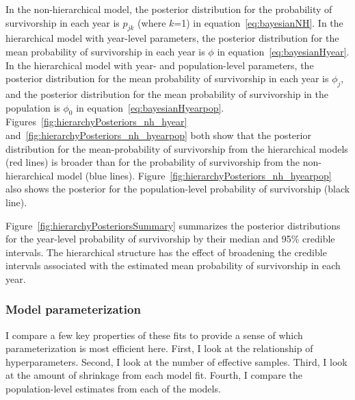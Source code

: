 \documentclass[12pt, oneside, titlepage]{article}   	%
\begin{document}
In the non-hierarchical model, the posterior distribution for the probability of survivorship in each year is $p_{jk}$ (where $k$=1) in equation~\eqref{eq:bayesianNH}. In the hierarchical model with year-level parameters, the posterior distribution for the mean probability of survivorship in each year is $\phi$ in equation~\eqref{eq:bayesianHyear}. In the hierarchical model with year- and population-level parameters, the posterior distribution for the mean probability of survivorship in each year is $\phi_j$, and the posterior distribution for the mean probability of survivorship in the population is $\phi_0$ in equation~\eqref{eq:bayesianHyearpop}. Figures~\ref{fig:hierarchyPosteriors_nh_hyear} and~\ref{fig:hierarchyPosteriors_nh_hyearpop} both show that the posterior distribution for the mean-probability of survivorship from the hierarchical models (red lines) is broader than for the probability of survivorship from the non-hierarchical model (blue lines). Figure~\ref{fig:hierarchyPosteriors_nh_hyearpop} also shows the posterior for the population-level probability of survivorship (black line).

Figure~\ref{fig:hierarchyPosteriorsSummary} summarizes the posterior distributions for the year-level probability of survivorship by their median and 95\% credible intervals. The hierarchical structure has the effect of broadening the credible intervals associated with the estimated mean probability of survivorship in each year. 
 
\subsubsection*{Model parameterization}
I compare a few key properties of these fits to provide a sense of which parameterization is most efficient here. First, I look at the relationship of hyperparameters. Second, I look at the number of effective samples. Third, I look at the amount of shrinkage from each model fit. Fourth, I compare the population-level estimates from each of the models. 
\end{document}
